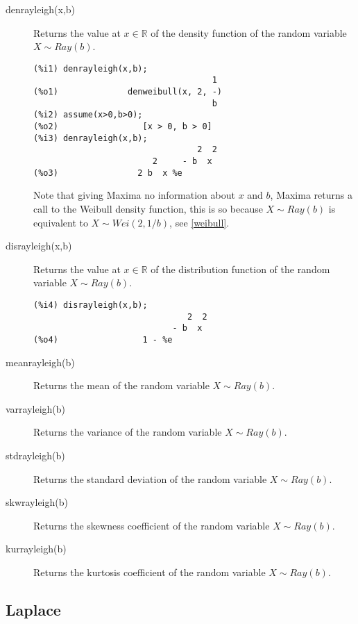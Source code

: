 \documentclass[12pt,a4paper]{article}
\newcommand{\R}{\mathbb{R}}
\begin{document}
\begin{description}

\item[denrayleigh(x,b)] Returns the value at $x \in \R$ of the density function of the random variable $X \sim Ray(b)$.

\begin{verbatim}
(%i1) denrayleigh(x,b);
                                    1
(%o1)              denweibull(x, 2, -)
                                    b
(%i2) assume(x>0,b>0);
(%o2)                 [x > 0, b > 0]
(%i3) denrayleigh(x,b);
                                 2  2
                        2     - b  x
(%o3)                2 b  x %e
\end{verbatim}
Note that giving Maxima no information about $x$ and $b$, Maxima returns a call to the Weibull density function, this is so because $X \sim Ray(b)$ is equivalent to $X \sim Wei(2,1/b)$, see \ref{weibull}.

\item[disrayleigh(x,b)] Returns the value at $x \in \R$ of the distribution function of the random variable $X \sim Ray(b)$.

\begin{verbatim}
(%i4) disrayleigh(x,b);
                               2  2
                            - b  x
(%o4)                 1 - %e
\end{verbatim}

\item[meanrayleigh(b)] Returns the mean of the random variable  $X \sim Ray(b)$.

\item[varrayleigh(b)] Returns the variance of the random variable  $X \sim Ray(b)$.

\item[stdrayleigh(b)] Returns the standard deviation of the random variable  $X \sim Ray(b)$.

\item[skwrayleigh(b)] Returns the skewness coefficient of the random variable  $X \sim Ray(b)$.

\item[kurrayleigh(b)] Returns the kurtosis coefficient of the random variable  $X \sim Ray(b)$.

\end{description}


\subsection{Laplace}
\end{document}
